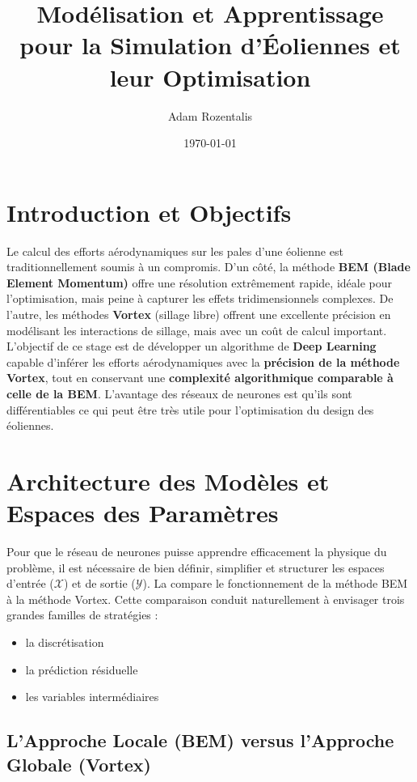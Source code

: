 \documentclass[11pt, a4paper]{article}
\title{\textbf{Modélisation et Apprentissage pour la Simulation d’Éoliennes et leur Optimisation}}
\author{Adam Rozentalis}
\date{\today}
\begin{document}
\maketitle

\section{Introduction et Objectifs}
Le calcul des efforts aérodynamiques sur les pales d'une éolienne est traditionnellement soumis à un compromis. D'un côté, la méthode \textbf{BEM (Blade Element Momentum)} offre une résolution extrêmement rapide, idéale pour l'optimisation, mais peine à capturer les effets tridimensionnels complexes. De l'autre, les méthodes \textbf{Vortex} (sillage libre) offrent une excellente précision en modélisant les interactions de sillage, mais avec un coût de calcul important.\\

L'objectif de ce stage est de développer un algorithme de \textbf{Deep Learning} capable d'inférer les efforts aérodynamiques avec la \textbf{précision de la méthode Vortex}, tout en conservant une \textbf{complexité algorithmique comparable à celle de la BEM}. L'avantage des réseaux de neurones est qu'ils sont différentiables ce qui peut être très utile pour l'optimisation du design des éoliennes.

\section{Architecture des Modèles et Espaces des Paramètres}

Pour que le réseau de neurones puisse apprendre efficacement la physique du problème, il est nécessaire de bien définir, simplifier et structurer les espaces d'entrée ($\mathcal{X}$) et de sortie ($\mathcal{Y}$). La  compare le fonctionnement de la méthode BEM à la méthode Vortex. Cette comparaison conduit naturellement à envisager trois grandes familles de stratégies : 
\begin{itemize}
	\item la discrétisation
	\item la prédiction résiduelle 
	\item les variables intermédiaires
\end{itemize}

\subsection{L'Approche Locale (BEM) versus l'Approche Globale (Vortex)}
\end{document}
